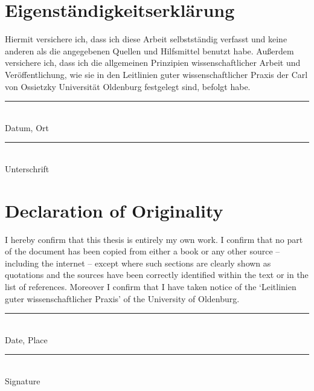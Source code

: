 \newpage
\section*{Eigenständigkeitserklärung}
%
Hiermit versichere ich, dass ich diese Arbeit selbstständig verfasst und keine anderen als die angegebenen Quellen und Hilfsmittel benutzt habe. Außerdem versichere ich, dass ich die allgemeinen Prinzipien wissenschaftlicher Arbeit und Veröffentlichung, wie sie in den Leitlinien guter wissenschaftlicher Praxis der Carl von Ossietzky Universität Oldenburg festgelegt sind, befolgt habe. 

\vspace{2em}

\begin{flushleft} \normalsize
\rule{5cm}{.4pt} \\
Datum, Ort\\[1em]

\rule{5cm}{.4pt} \\
Unterschrift\\
\end{flushleft}


\newpage
\section*{Declaration of Originality}
%
I hereby confirm that this thesis is entirely my own work. I confirm that no part of the document has been copied from either a book or any other source – including the internet – except where such sections are clearly shown as quotations and the sources have been correctly identified within the text or in the list of references.
Moreover I confirm that I have taken notice of the ‘Leitlinien guter wissenschaftlicher Praxis’ of the University of Oldenburg.


\vspace{2em}

\begin{flushleft} \normalsize
\rule{5cm}{.4pt} \\
Date, Place\\[1em]

\rule{5cm}{.4pt} \\
Signature\\
\end{flushleft}


